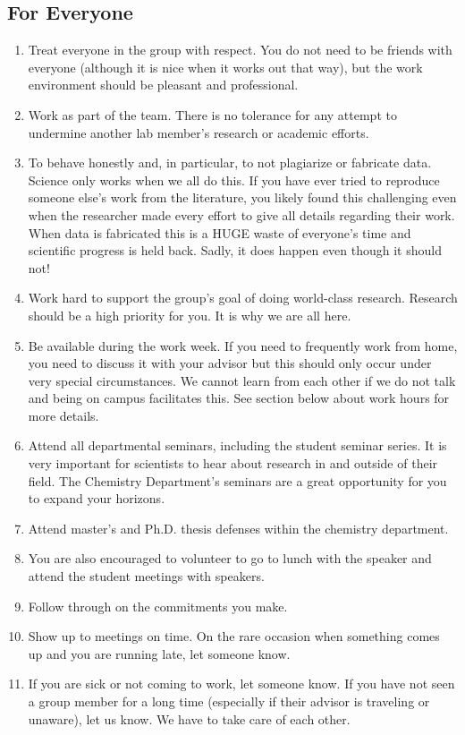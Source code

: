 \documentclass[letterpaper]{article}
\begin{document}
\subsection{For Everyone}
\begin{enumerate}
\item Treat everyone in the group with respect. You do not need to be friends with everyone (although it is nice when it works out that way), but the work environment should be pleasant and professional. 
\item Work as part of the team.  There is  no tolerance for any attempt to undermine another lab member's research or academic efforts.
\item To behave honestly and, in particular, to not plagiarize or fabricate data. Science only works when we all do this. If you have ever tried to reproduce someone else's work from the literature, you likely found this challenging even when the researcher made every effort to give all details regarding their work. When data is fabricated this is a HUGE waste of everyone's time and scientific progress is held back. Sadly, it does happen even though it should not!
\item Work hard to support the group's goal of doing world-class research. Research should be a high priority for you. It is why we are all here. 
\item Be available during the work week. If you need to frequently work from home, you need to discuss it with your advisor but this should only occur under very special circumstances. We cannot learn from each other if we do not talk and being on campus facilitates this. See section below about work hours for more details.
\item Attend all departmental seminars, including the student seminar series. It is very important for scientists to hear about research in and outside of their field. The Chemistry Department's seminars are a great opportunity for you to expand your horizons. 
\item Attend master's and Ph.D. thesis defenses within the chemistry department.
\item You are also encouraged to volunteer to go to lunch with the speaker and attend the student meetings with speakers. 
\item Follow through on the commitments you make.
\item Show up to meetings on time. On the rare occasion when something comes up and you are running late, let someone know.
\item If you are sick or not coming to work, let someone know. If you have not seen a group member for a long time (especially if their advisor is traveling or unaware), let us know. We have to take care of each other.

\end{enumerate}
\end{document}
